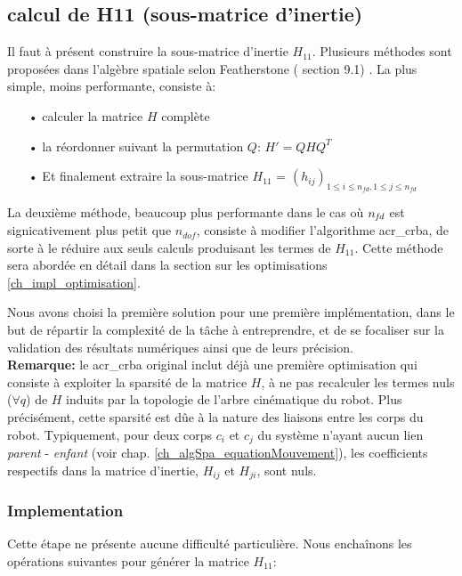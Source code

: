 \documentclass{report}
\begin{document}
\subsection{calcul de H11 (sous-matrice d'inertie)}

Il faut à présent construire la sous-matrice d'inertie $H_{11}$. Plusieurs méthodes sont proposées dans l'algèbre spatiale selon Featherstone (\cite{bib_featherstone} section 9.1) . La plus simple, moins performante, consiste à:
\begin{itemize}
\item[•] calculer la matrice $H$ complète
\item[•] la réordonner suivant la permutation $Q$: $H'=Q H Q^T$
\item[•] Et finalement extraire la sous-matrice $H_{11}$ = $(h_{ij})_{1 \leqslant i \leqslant n_{fd},1 \leqslant j \leqslant n_{fd}}$
\end{itemize}
\bigskip
La deuxième méthode, beaucoup plus performante dans le cas où $n_{\emph{fd}}$ est signicativement plus petit que $n_{dof}$, consiste à modifier l'algorithme \gls{acr_crba}, de sorte à le réduire aux seuls calculs produisant les termes de $H_{11}$. Cette méthode sera abordée en détail dans la section sur les optimisations \ref{ch_impl_optimisation}.

Nous avons choisi la première solution pour une première implémentation, dans le but de répartir la complexité de la tâche à entreprendre, et de se focaliser sur la validation des résultats numériques ainsi que de leurs précision.\\
\textbf{Remarque:} le \gls{acr_crba} original inclut déjà une première optimisation qui consiste à exploiter la sparsité de la matrice $H$, \cad à ne pas recalculer les termes nuls ($\forall q$) de $H$ induits par la topologie de l'arbre cinématique du robot. Plus précisément, cette sparsité est dûe à la nature des liaisons entre les corps du robot. Typiquement, pour deux corps $c_i$ et $c_j$ du système n'ayant aucun lien \emph{parent} - \emph{enfant} (voir chap. \ref{ch_algSpa_equationMouvement}), les coefficients respectifs dans la matrice d'inertie, $H_{ij}$ et $H_{ji}$, sont nuls.

\subsubsection{Implementation}

Cette étape ne présente aucune difficulté particulière. Nous enchaînons les opérations suivantes pour générer la matrice $H_{11}$:
\end{document}

